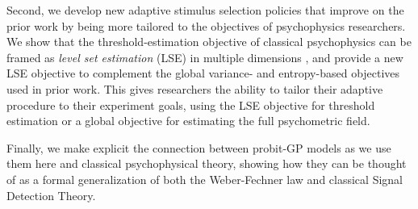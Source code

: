 \documentclass[../main.tex]{subfiles}
\begin{document}
Second, we develop new adaptive stimulus selection policies that improve on the prior work by being more tailored to the objectives of psychophysics researchers. We show that the threshold-estimation objective of classical psychophysics can be framed as \emph{level set estimation} (LSE) in multiple dimensions \citep{Gotovos2013}, and provide a new LSE objective to complement the global variance- and entropy-based objectives used in prior work. This gives researchers the ability to tailor their adaptive procedure to their experiment goals, using the LSE objective for threshold estimation or a global objective for estimating the full psychometric field.

Finally, we make explicit the connection between probit-GP models as we use them here and classical psychophysical theory, showing how they can be thought of as a formal generalization of both the Weber-Fechner law and classical Signal Detection Theory.
\end{document}
